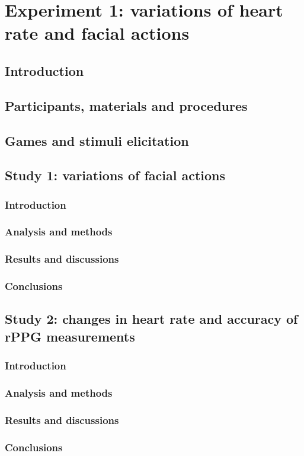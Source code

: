 \chapter{Experiment 1: variations of heart rate and facial actions}

\section{Introduction}

\section{Participants, materials and procedures}

\section{Games and stimuli elicitation}

\section{Study 1: variations of facial actions}
\subsection{Introduction}
\subsection{Analysis and methods}
\subsection{Results and discussions}
\subsection{Conclusions}

\section{Study 2: changes in heart rate and accuracy of rPPG measurements}
\subsection{Introduction}
\subsection{Analysis and methods}
\subsection{Results and discussions}
\subsection{Conclusions}
